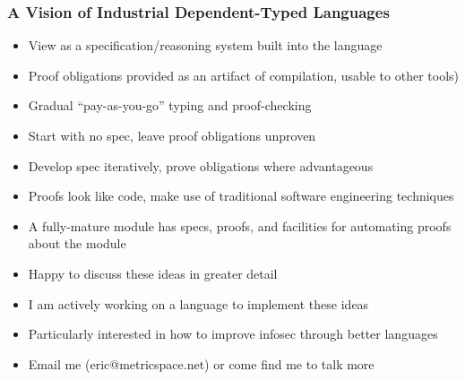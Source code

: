 \documentclass{beamer}
\begin{document}
\begin{frame}
  \frametitle{A Vision of Industrial Dependent-Typed Languages}
  \begin{itemize}
    \item View as a specification/reasoning system built into the language
    \item Proof obligations provided as an artifact of compilation,
      usable to other tools)
    \item Gradual ``pay-as-you-go'' typing and proof-checking
    \item Start with no spec, leave proof obligations unproven
    \item Develop spec iteratively, prove obligations where advantageous
    \item Proofs look like code, make use of traditional software
      engineering techniques
    \item A fully-mature module has specs, proofs, and facilities for
      automating proofs about the module
  \end{itemize}
\end{frame}

\begin{frame}
  \begin{itemize}
    \item Happy to discuss these ideas in greater detail
    \item I am actively working on a language to implement these ideas
    \item Particularly interested in how to improve infosec through
      better languages
    \item Email me (eric@metricspace.net) or come find me to talk more
  \end{itemize}
\end{frame}
\end{document}
